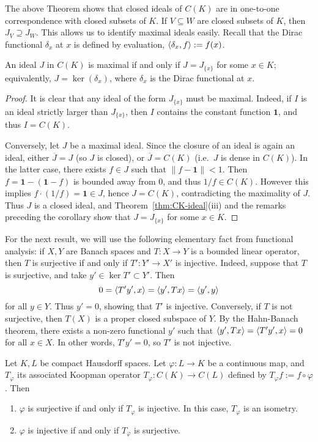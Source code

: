 The above Theorem shows that closed ideals of $C(K)$ are in one-to-one correspondence with closed subsets of $K$. If $V \subseteq W$ are closed subsets of $K$, then $J_V \supseteq J_W$. This allows us to identify maximal ideals easily. Recall that the Dirac functional $\delta_x$ at $x$ is defined by evaluation, $\braket{\delta_x, f} := f(x)$.
\begin{corollary}
	An ideal $J$ in $C(K)$ is maximal if and only if $J = J_{\{x\}}$ for some $x\in K$; equivalently, $J = \ker(\delta_x)$, where $\delta_x$ is the Dirac functional at $x$.
\end{corollary}

\begin{proof}
	It is clear that any ideal of the form $J_{\{x\}}$ must be maximal. Indeed, if $I$ is an ideal strictly larger than $J_{\{x\}}$, then $I$ contains the constant function $\mathbf{1}$, and thus $I = C(K)$.
	
	Conversely, let $J$ be a maximal ideal. Since the closure of an ideal is again an ideal, either $\overline{J} = J$ (so $J$ is closed), or $\overline{J} = C(K)$ (i.e.\ $J$ is dense in $C(K)$). In the latter case, there exists $f \in J$ such that $\|f-\mathbf{1}\| < 1$. Then $f = \mathbf{1}-(\mathbf{1}-f)$ is bounded away from 0, and thus $1/f \in C(K)$. However this implies $f \cdot (1/f) = \mathbf{1} \in J$, hence $J = C(K)$, contradicting the maximality of $J$. Thus $J$ is a closed ideal, and Theorem~\ref{thm:CK-ideal}(iii) and the remarks preceding the corollary show that $J = J_{\{x\}}$ for some $x\in K$.
\end{proof}

For the next result, we will use the following elementary fact from functional analysis: if $X,Y$ are Banach spaces and $T:X\to Y$ is a bounded linear operator, then $T$ is surjective if and only if $T':Y'\to X'$ is injective. Indeed, suppose that $T$ is surjective, and take $y'\in \ker T' \subset Y'$. Then
\begin{equation*}
	0 = \braket{T'y',x} = \braket{y',Tx} = \braket{y',y}
\end{equation*}
for all $y\in Y$. Thus $y'=0$, showing that $T'$ is injective. Conversely, if $T$ is not surjective, then $T(X)$ is a proper closed subspace of $Y$. By the Hahn-Banach theorem, there exists a non-zero functional $y'$ such that $\braket{y',Tx} = \braket{T'y',x}=0$ for all $x\in X$. In other words, $T'y'=0$, so $T'$ is not injective.

\begin{lemma}
	Let $K, L$ be compact Hausdorff spaces. Let $\varphi:L\to K$ be a continuous map, and $T_\varphi$ its associated Koopman operator $T_\varphi: C(K)\to C(L)$ defined by $T_\varphi f := f \circ \varphi$. Then
	\begin{enumerate}[\upshape (i)]
		\item $\varphi$ is surjective if and only if $T_\varphi$ is injective. In this case, $T_\varphi$ is an isometry.
		\item $\varphi$ is injective if and only if $T_\varphi$ is surjective.
	\end{enumerate}
\end{lemma}

